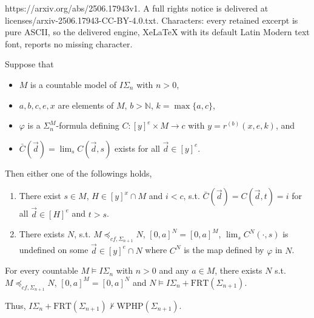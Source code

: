 \documentclass[10pt,a4paper]{amsart}
\newcommand{\FRT}{\mathrm{FRT}}
\newcommand{\WPHP}{\mathrm{WPHP}}
\begin{document}
https://arxiv.org/abs/2506.17943v1. A full rights notice is delivered at licenses/arxiv-2506.17943-CC-BY-4.0.txt. Characters: every retained excerpt is pure ASCII, so the delivered engine, XeLaTeX with its default Latin Modern text font, reports no missing character.
\begin{lemma}\label{lem:FRT-WPHP}
Suppose that 
\begin{itemize}
 \item[(a)] $M$ is a countable model of $I\Sigma_n$ with $n > 0$,
 \item[(b)] $a,b,c,e,x$ are elements of $M$, $b > \mathbb{N}$, $k = \max\{a,c\}$,
 \item[(c)] $\varphi$ is a $\Sigma_n^M$-formula defining $C: [y]^e \times M \to c$ 
 with $y = r^{(b)}(x,e,k)$, and
 \item[(d)] $\bar{C}(\vec{d}) = \lim_s C(\vec{d},s)$ exists for all $\vec{d} \in [y]^e$.
\end{itemize}
Then either one of the followings holds,
\begin{enumerate}
 \item[(1)] There exist $s \in M$, $H \in [y]^x \cap M$ and $i < c$, s.t.
 $\bar{C}(\vec{d}) = C(\vec{d},t) = i$ for all $\vec{d} \in [H]^e$ and $t > s$.
 \item[(2)] There exists $N$, s.t. $M \preceq_{cf,\Sigma_{n+1}} N$, 
 $[0,a]^N = [0,a]^M$, $\lim_s C^N(\cdot,s)$ is undefined on some $\vec{d} \in [y]^e \cap N$ where $C^N$ is the map defined by $\varphi$ in $N$.
\end{enumerate}
\end{lemma}

\begin{theorem}\label{thm:FRT-WPHP}
For every countable $M \models I\Sigma_n$ with $n > 0$ and any $a \in M$,
there exists $N$ s.t. $M \preceq_{cf,\Sigma_{n+1}} N$, $[0,a]^M = [0,a]^N$ and
$N \models I\Sigma_n + \FRT(\Sigma_{n+1})$.

Thus,
$I\Sigma_n + \FRT(\Sigma_{n+1}) \not\vdash \WPHP(\Sigma_{n+1})$.
\end{theorem}
\end{document}
